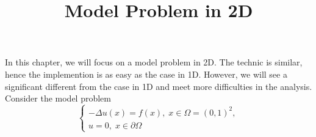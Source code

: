 \documentclass{SBCbookchapter}
\author{}
\title{Model Problem in 2D}
\newcounter{chapter}\setcounter{chapter}{1}
\begin{document}
\maketitle

In this chapter, we will focus on a model problem in 2D. The technic is similar, hence the implemention is as easy as the case in 1D. However, we will see a significant different from the case in 1D and meet more difficulties in the analysis. Consider the model problem
\begin{equation*}
	\left\{
		\begin{array}{l}
		-\Delta u(x)=f(x),\;x\in\Omega=(0,1)^2,\\
		u=0,\;x\in \partial\Omega
		\end{array}
	\right.
\end{equation*}

\vspace{3em}



\end{document}
